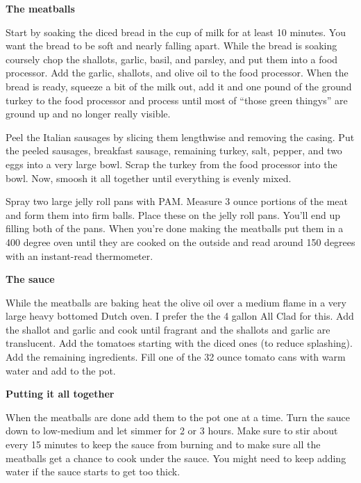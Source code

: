 \documentclass{article}
\begin{document}
\textbf{The meatballs}

Start by soaking the diced bread in the cup of milk for at least 10 minutes. You want the bread to be
soft and nearly falling apart. While the bread is soaking coursely chop the shallots, garlic, basil,
and parsley, and put them into a food processor.  Add the garlic, shallots, and olive oil to the food processor.
When the bread is ready, squeeze a bit of the milk out, add it and one pound of the ground turkey to the
food processor and process until most of ``those green thingys'' are ground up and no longer really visible.

Peel the Italian sausages by slicing them lengthwise and removing the casing. Put the peeled sausages,
breakfast sausage, remaining turkey, salt, pepper, and two eggs into a very large bowl. Scrap the turkey
from the food processor into the bowl. Now, smoosh it all together until everything is evenly mixed.

Spray two large jelly roll pans with PAM. Measure 3 ounce portions of the meat and form them
into firm balls. Place these on the jelly roll pans. You'll end up filling both of the pans. When you're done
making the meatballs put them in a 400 degree oven until they are cooked on the outside and read around
150 degrees with an instant-read thermometer.

\textbf{The sauce}

While the meatballs are baking heat the olive oil over a medium flame in a very large heavy bottomed Dutch oven.
I prefer the the 4 gallon All Clad for this. Add the shallot and garlic and cook until fragrant and the shallots
and garlic are translucent. Add the tomatoes starting with the diced ones (to reduce splashing). Add the remaining
ingredients. Fill one of the 32 ounce tomato cans with warm water and add to the pot.

\textbf{Putting it all together}

When the meatballs are done add them to the pot one at a time. Turn the sauce down to low-medium and let simmer
for 2 or 3 hours. Make sure to stir about every 15 minutes to keep the sauce from burning and to make sure all the
meatballs get a chance to cook under the sauce. You might need to keep adding water if the sauce starts to get too
thick.


\end{document}
